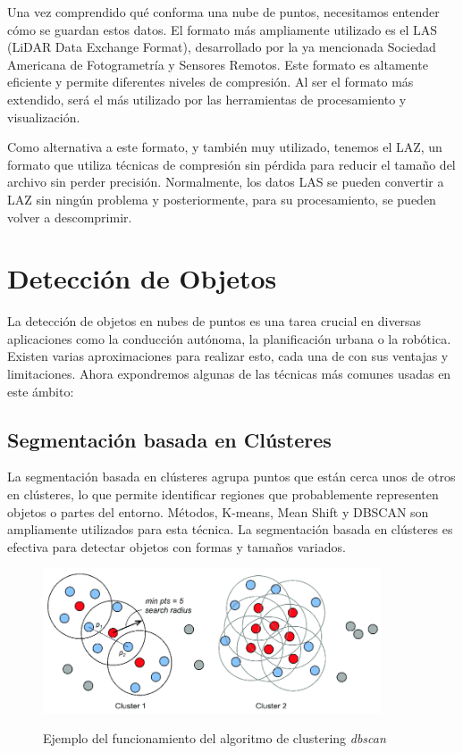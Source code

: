 \vspace{0.5cm}

Una vez comprendido qué conforma una nube de puntos, necesitamos entender cómo se guardan estos datos. El formato más ampliamente utilizado es el LAS (LiDAR Data Exchange Format), desarrollado por la ya mencionada Sociedad Americana de Fotogrametría y Sensores Remotos. Este formato es altamente eficiente y permite diferentes niveles de compresión. Al ser el formato más extendido, será el más utilizado por las herramientas de procesamiento y visualización.

Como alternativa a este formato, y también muy utilizado, tenemos el LAZ, un formato que utiliza técnicas de compresión sin pérdida para reducir el tamaño del archivo sin perder precisión. Normalmente, los datos LAS se pueden convertir a LAZ sin ningún problema y posteriormente, para su procesamiento, se pueden volver a descomprimir.

\section{Detección de Objetos}

La detección de objetos en nubes de puntos es una tarea crucial en diversas aplicaciones como la conducción autónoma, la planificación urbana o la robótica. Existen varias aproximaciones para realizar esto, cada una de con sus ventajas y limitaciones. Ahora expondremos algunas de las técnicas más comunes usadas en este ámbito:

\subsection{Segmentación basada en Clústeres}

La segmentación basada en clústeres agrupa puntos que están cerca unos de otros en clústeres, lo que permite identificar regiones que probablemente representen objetos o partes del entorno. Métodos, K-means, Mean Shift y DBSCAN son ampliamente utilizados para esta técnica. La segmentación basada en clústeres es efectiva para detectar objetos con formas y tamaños variados.

\begin{figure}[h]
\centering
\includegraphics[width=10cm]{imaxes/The-DBSCAN-algorithm-and-two-generated-clusters-There-are-three-types-of-points-as.png}
\label{fig:pointnetc}
\caption{Ejemplo del funcionamiento del algoritmo de clustering \textit{dbscan} \cite{dbscan}}
\end{figure}


